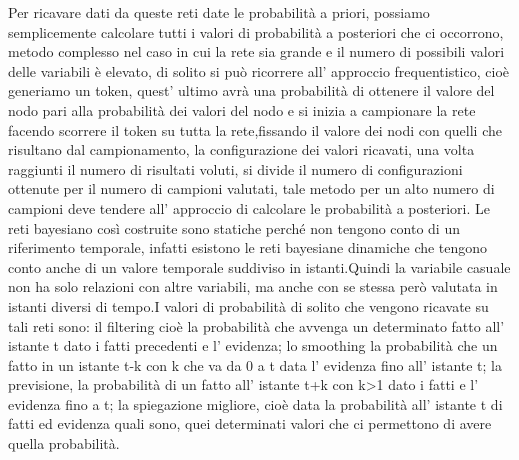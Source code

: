 		Per ricavare dati da queste reti date le probabilità a priori, possiamo semplicemente calcolare tutti i valori di probabilità a posteriori che ci occorrono, metodo complesso nel caso in cui la rete sia grande e il numero di possibili valori delle variabili è elevato, di solito si può ricorrere all' approccio frequentistico, cioè generiamo un token, quest' ultimo avrà una probabilità di ottenere il valore del nodo pari alla probabilità dei valori del nodo e si inizia a campionare la rete facendo scorrere il token su tutta la rete,fissando il valore dei nodi con quelli che risultano dal campionamento, la configurazione dei valori ricavati, una volta raggiunti il numero di risultati voluti, si divide il numero di configurazioni ottenute per il numero di campioni valutati, tale metodo per un alto numero di campioni deve tendere all' approccio di calcolare le probabilità a posteriori. Le reti bayesiano così costruite sono statiche perché non tengono conto di un riferimento temporale, infatti esistono le reti bayesiane dinamiche che tengono conto anche di un valore temporale suddiviso in istanti.Quindi la variabile casuale non ha solo relazioni con altre variabili, ma anche con se stessa però valutata in istanti diversi di tempo.I valori di probabilità di solito che vengono ricavate su tali reti sono: il filtering cioè la probabilità che avvenga un determinato fatto all' istante t dato i fatti precedenti e l' evidenza; lo smoothing la probabilità che un fatto in un istante t-k con k che va da 0 a t data l' evidenza fino all' istante t;
		la previsione, la probabilità di un fatto all' istante t+k con k>1 dato i fatti e l' evidenza fino a t;
		la spiegazione migliore, cioè data la probabilità all' istante t di fatti ed evidenza quali sono, quei determinati valori che ci permettono di avere quella probabilità.
		\par 
